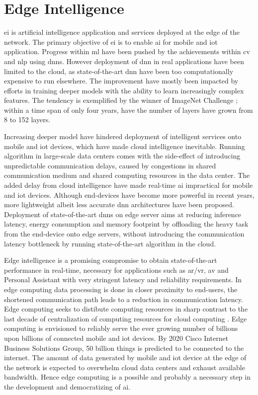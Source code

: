 \hypertarget{Edge Intelligence}{%
	\chapter{Edge Intelligence}\label{ch:edgeintelligence}}
\thispagestyle{fancy}

\acrlong{ei} is artificial intelligence application and services deployed at the edge of the network. The primary objective of \gls{ei} is to enable \gls{ai} for mobile and \gls{iot} application. Progress within \gls{ml} have been pushed by the achievements within \gls{cv} and \gls{nlp} using \gls{dnn}s. However deployment of \gls{dnn} in real applications have been limited to the cloud, as state-of-the-art \gls{dnn} have been too computationally expensive to run elsewhere. The improvement have mostly been impacted by efforts in training deeper models with the ability to learn increasingly complex features. The tendency is exemplified by the winner of ImageNet Challenge \cite{russakovsky_imagenet_2015}; within a time span of only four years, have the number of layers have grown from 8 to 152 layers. 

Increasing deeper model have hindered deployment of intelligent services onto mobile and \gls{iot} devices, which have made cloud intelligence inevitable. Running algorithm in large-scale data centers comes with the side-effect of introducing unpredictable communication delays, caused by congestions in shared communication medium and shared computing resources in the data center. The added delay from cloud intelligence have made real-time \gls{ai} impractical for mobile and \gls{iot} devices. Although end-devices have become more powerful in recent years, more lightweight albeit less accurate \gls{dnn} architectures have been proposed. Deployment of state-of-the-art \gls{dnn}s on edge server aims at reducing inference latency, energy consumption and memory footprint by offloading the heavy task from the end-device onto edge servers, without introducing the communication latency bottleneck by running state-of-the-art algorithm in the cloud. 


Edge intelligence is a promising compromise to obtain state-of-the-art performance in real-time, necessary for applications such as \gls{ar}/\gls{vr}, \gls{av} and Personal Assistant with very stringent latency and reliability requirements. In edge computing data processing is done in closer proximity to end-users, the shortened communication path leads to a reduction in communication latency. Edge computing seeks to distibute computing resources in sharp contrast to the last decade of centralization of computing resources for cloud computing \cite{shi_edge_2016}. Edge computing is envisioned to reliably serve the ever growing number of billions upon billions of connected mobile and \gls{iot} devices. By 2020 Cisco Internet Business Solutions Group, 50 billion things is predicted to be connected to the internet. The amount of data generated by mobile and \gls{iot} device at the edge of the network is expected to overwhelm cloud data centers and exhaust available bandwidth. Hence edge computing is a possible and probably a necessary step in the development and democratizing of \gls{ai}.

